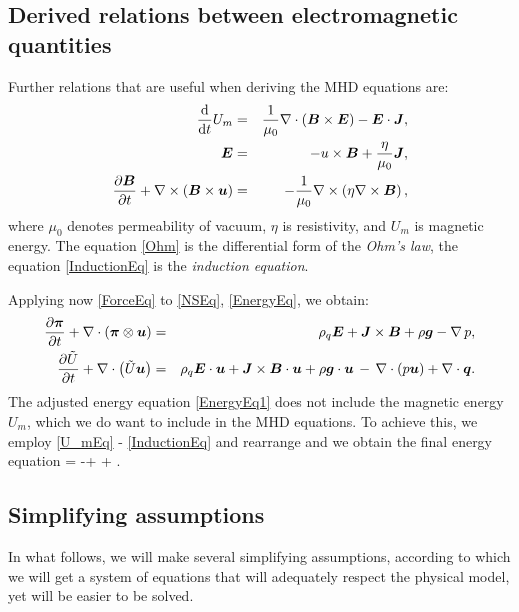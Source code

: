 \subsection{Derived relations between electromagnetic quantities}
Further relations that are useful when deriving the MHD equations are:
\begin{eqnarray}
\label{U_mEq} \frac{\text{d}}{\text{d}t} U_m & = & \frac{1}{\mu_0}\nabla \cdot \left( \mbox{\boldmath $B$}\times\mbox{\boldmath $E$}\right) - \mbox{\boldmath $E$}\cdot\mbox{\boldmath $J$},\\
\label{Ohm} \mbox{\boldmath $E$} & = & -u \times \mbox{\boldmath $B$} + \frac{\eta}{\mu_0}\mbox{\boldmath $J$},\\
\label{InductionEq} \frac{\partial{\mbox{\boldmath $B$}}}{\partial{t}} + \nabla \times \left( \mbox{\boldmath $B$} \times \mbox{\boldmath $u$} \right) & = & -\frac{1}{\mu_0} \nabla \times \left( \eta \nabla \times \mbox{\boldmath $B$} \right),
\end{eqnarray}
where $\mu_0$ denotes permeability of vacuum, $\eta$ is resistivity, and $U_m$ is magnetic energy.
The equation \ref{Ohm} is the differential form of the \textit{Ohm's law}, the equation \ref{InductionEq} is the \textit{induction equation}.

Applying now \ref{ForceEq} to \ref{NSEq}, \ref{EnergyEq}, we obtain:
\begin{eqnarray}
\label{NSEq1} \frac{\partial{\mbox{\boldmath $\pi$}}}{\partial{t}} + \nabla\cdot\left(\mbox{\boldmath $\pi$}\otimes\mbox{\boldmath $u$}\right)& = & \rho_q\mbox{\boldmath $E$} + \mbox{\boldmath $J$}\times\mbox{\boldmath $B$} + \rho\mbox{\boldmath $g$} - \nabla\,p,\\
\label{EnergyEq1} \frac{\partial{\tilde{U}}}{\partial{t}} + \nabla\cdot\left({\tilde{U}}\mbox{\boldmath $u$}\right) & = & \rho_q\mbox{\boldmath $E$}\cdot\mbox{\boldmath $u$} + \mbox{\boldmath $J$}\times\mbox{\boldmath $B$}\cdot\mbox{\boldmath $u$} + \rho\mbox{\boldmath $g$}\cdot\mbox{\boldmath $u$} \,-\,\nabla\cdot\left({p}\mbox{\boldmath $u$}\right) + \nabla\cdot\mbox{\boldmath $q$}.
\end{eqnarray}
The adjusted energy equation \ref{EnergyEq1} does not include the magnetic energy $U_m$, which we do want to include in the MHD equations. To achieve this, we employ \ref{U_mEq} - \ref{InductionEq} and rearrange and we obtain the final energy equation
\be
\label{EnergyEqPrefinal}  = -\nabla\cdot{} + \rho \bfg \cdot \bfu + \nabla\cdot\bfq.
\ee

\subsection{Simplifying assumptions}
In what follows, we will make several simplifying assumptions, according to which we will get a system of equations that will adequately respect the physical model, yet will be easier to be solved.
